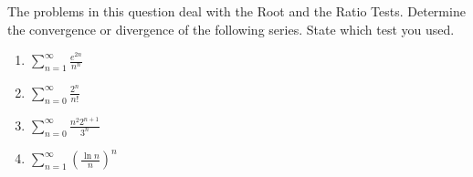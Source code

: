 \documentclass[9pt]{article}
\begin{document}
\fi

\newpage

\vspace{5mm}

\item The problems in this question deal with the Root and the Ratio Tests. Determine the convergence or divergence of the following series. State which test you used.

\begin{enumerate}
\item  $ \displaystyle \sum_{n=1}^{\infty} \frac{e^{2n}}{n^n} $
\item $ \displaystyle \sum_{n=0}^{\infty} \frac{2^n}{n!} $
\item $ \displaystyle \sum_{n=0}^{\infty} \frac{n^2  2^{n+1}}{3^n}  $
\item $ \displaystyle \sum_{n=1}^{\infty} \left ( \frac{\ln n}{n} \right )^n $
\end{enumerate}
\end{document}
